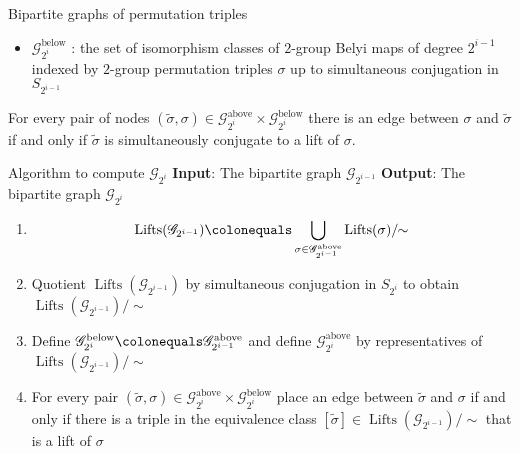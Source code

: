 \documentclass[xcolor=dvipsnames,handout]{beamer}
\theoremstyle{plain}
\newcommand{\wt}[1]{\widetilde{#1}}
\DeclareMathOperator{\Lifts}{Lifts}
\begin{document}
{\begin{frame}{Bipartite graphs of permutation triples}
\begin{itemize}
          $\wt{\sigma}$ up to simultaneous conjugation
          in $S_{2^i}$
        \item
          $\mathscr{G}_{2^i}^\text{below}$ :
          the set of isomorphism classes of $2$-group Belyi maps
          of degree $2^{i-1}$
          indexed by $2$-group permutation triples
          $\sigma$ up to simultaneous conjugation
          in $S_{2^{i-1}}$
      \end{itemize}
      \pause
      For every pair of nodes
      $(\wt{\sigma},\sigma)\in
      \mathscr{G}_{2^i}^\text{above}\times
      \mathscr{G}_{2^i}^\text{below}$
      there is an edge between
      $\sigma$ and $\wt{\sigma}$
      if and only if $\wt{\sigma}$ is
      simultaneously conjugate to a lift of
      $\sigma$.
    \end{frame}
    \begin{frame}{Algorithm to compute $\mathscr{G}_{2^i}$}
      \textbf{Input}:
      The bipartite graph $\mathscr{G}_{2^{i-1}}$
      \newline
      \textbf{Output}:
      The bipartite graph $\mathscr{G}_{2^{i}}$
      \pause\par
      \begin{enumerate}
        \item
          \[
            \Lifts(\mathscr{G}_{2^{i-1}})
            \colonequals
            \bigcup_{\sigma\in\mathscr{G}_{2^{i-1}}^\text{above}}\Lifts(\sigma)/\!\!\sim
          \]
        \item\pause
          Quotient
          $\Lifts(\mathscr{G}_{2^{i-1}})$
          by simultaneous conjugation in $S_{2^i}$
          to obtain
          $\Lifts(\mathscr{G}_{2^{i-1}})/\!\!\sim$
        \item\pause
          Define $\mathscr{G}_{2^i}^\text{below}\colonequals
          \mathscr{G}_{2^{i-1}}^\text{above}$
          and define
          $\mathscr{G}_{2^i}^\text{above}$
          by representatives of
          $\Lifts(\mathscr{G}_{2^{i-1}})/\!\!\sim$
        \item\pause
          For every pair
          $(\wt{\sigma},\sigma)\in
          \mathscr{G}_{2^i}^\text{above}
          \times
          \mathscr{G}_{2^i}^\text{below}$
          place an edge between
          $\wt{\sigma}$ and $\sigma$
          if and only if there is a triple in
          the equivalence class
          $[\wt{\sigma}]\in
          \Lifts(\mathscr{G}_{2^{i-1}})/\!\!\sim$
          that is a lift of $\sigma$
      \end{enumerate}
    \end{frame}
}
\end{document}
